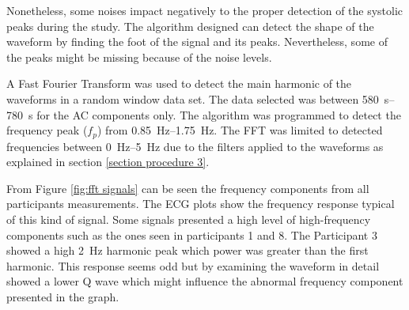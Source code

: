 Nonetheless, some noises impact negatively to the proper detection of the systolic peaks during the study. The algorithm designed can detect the shape of the waveform by finding the foot of the signal and its peaks. Nevertheless, some of the peaks might be missing because of the noise levels.

A Fast Fourier Transform was used to detect the main harmonic of the waveforms in a random window data set. The data selected was between \SIrange{580}{780}{\second} for the AC components only. The algorithm was programmed to detect the frequency peak ($f_p$) from \SIrange{0.85}{1.75}{\hertz}. The FFT was limited to detected frequencies between \SIrange{0}{5}{\hertz} due to the filters applied to the waveforms as explained in section \ref{section procedure 3}.

From Figure \ref{fig:fft signals} can be seen the frequency components from all participants measurements. The ECG plots show the frequency response typical of this kind of signal. Some signals presented a high level of high-frequency components such as the ones seen in participants 1 and 8. The Participant 3 showed a high \SI{2}{\hertz} harmonic peak which power was greater than the first harmonic. This response seems odd but by examining the waveform in detail showed a lower Q wave which might influence the abnormal frequency component presented in the graph.

